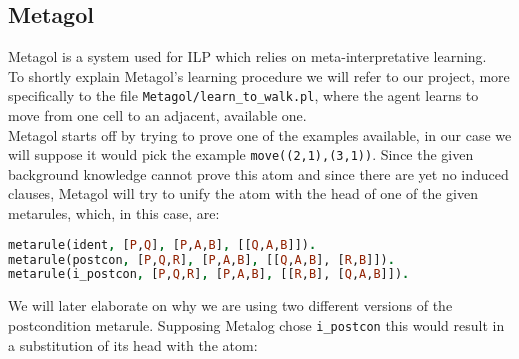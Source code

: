 \subsection{Metagol}
Metagol is a system used for ILP which relies on meta-interpretative learning.\\
To shortly explain Metagol's learning procedure we will refer to our project, more
specifically to the file \texttt{Metagol/learn\_to\_walk.pl}, where the agent learns to
move from one cell to an adjacent, available one.\\
Metagol starts off by trying to prove one of the examples available, in our case we will
suppose it would pick the example \texttt{move((2,1),(3,1))}. Since the given background
knowledge cannot prove this atom and since there are yet no induced clauses, Metagol will
try to unify the atom with the head of one of the given metarules, which, in this case, are:
\begin{lstlisting}[language=Prolog, caption=Metarules in \texttt{learning\_to\_walk.pl}]
metarule(ident, [P,Q], [P,A,B], [[Q,A,B]]).
metarule(postcon, [P,Q,R], [P,A,B], [[Q,A,B], [R,B]]).
metarule(i_postcon, [P,Q,R], [P,A,B], [[R,B], [Q,A,B]]).  
\end{lstlisting}
We will later elaborate on why we are using two different versions of the postcondition metarule.
Supposing Metalog chose \texttt{i\_postcon} this would result in a substitution of its head
with the atom: